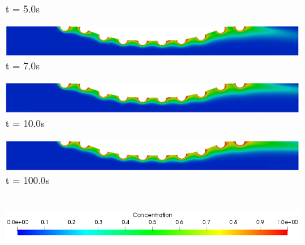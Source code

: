 \begin{figure}[H]
\begin{minipage}{.50\linewidth}
      t = 5.0s
     \end{minipage}%
     \begin{minipage}{.50\linewidth}
      \centering
      \includegraphics[scale=0.18]{./02_chaps/cap_solution/figure/conc10_quadCurvedStrut6.png}\\
      t = 7.0s
     \end{minipage}
     \begin{minipage}{.50\linewidth}
     \medskip
      \centering
      \includegraphics[scale=0.18]{./02_chaps/cap_solution/figure/conc10_quadCurvedStrut7.png}\\
      t = 10.0s
     \end{minipage}%
     \begin{minipage}{.50\linewidth}
     \medskip
      \centering
      \includegraphics[scale=0.18]{./02_chaps/cap_solution/figure/conc10_quadCurvedStrut8.png}\\
      t = 100.0s
     \end{minipage}\\[10pt]
      \centering
      \includegraphics[scale=0.5]{./02_chaps/cap_solution/figure/conc1_CurvedStrutScale.png}\\
     \medskip
     \label{quad conc field curved stent sc 10}
\end{figure}


